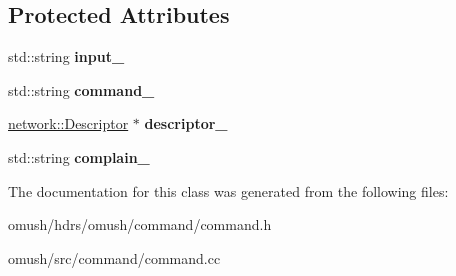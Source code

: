 \subsection*{Protected Attributes}
\begin{DoxyCompactItemize}
\item 
\hypertarget{classomush_1_1command_1_1_command_a59b23259e33c8d0d6c57dea5259a863b}{std\-::string {\bfseries input\-\_\-}}\label{classomush_1_1command_1_1_command_a59b23259e33c8d0d6c57dea5259a863b}

\item 
\hypertarget{classomush_1_1command_1_1_command_aeaf9633cac401cd49177c5e7fff10cdd}{std\-::string {\bfseries command\-\_\-}}\label{classomush_1_1command_1_1_command_aeaf9633cac401cd49177c5e7fff10cdd}

\item 
\hypertarget{classomush_1_1command_1_1_command_ae3b141c3dabc1baa5a84a709e95c9a0e}{\hyperlink{classomush_1_1network_1_1_descriptor}{network\-::\-Descriptor} $\ast$ {\bfseries descriptor\-\_\-}}\label{classomush_1_1command_1_1_command_ae3b141c3dabc1baa5a84a709e95c9a0e}

\item 
\hypertarget{classomush_1_1command_1_1_command_a84e5865eaf6543f79455ffdb5f559d24}{std\-::string {\bfseries complain\-\_\-}}\label{classomush_1_1command_1_1_command_a84e5865eaf6543f79455ffdb5f559d24}

\end{DoxyCompactItemize}


The documentation for this class was generated from the following files\-:\begin{DoxyCompactItemize}
\item 
omush/hdrs/omush/command/command.\-h\item 
omush/src/command/command.\-cc\end{DoxyCompactItemize}
